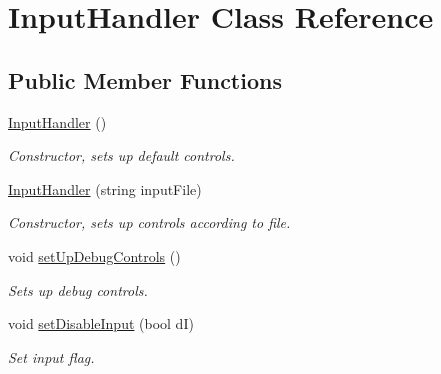 \hypertarget{class_input_handler}{}\section{Input\+Handler Class Reference}
\label{class_input_handler}
\subsection*{Public Member Functions}
\begin{DoxyCompactItemize}
\item 
\mbox{\label{class_input_handler_a698aa4af4f326a9881835fda251ca996}} 
\mbox{\hyperlink{class_input_handler_a698aa4af4f326a9881835fda251ca996}{Input\+Handler}} ()
\begin{DoxyCompactList}\small\item\em Constructor, sets up default controls. \end{DoxyCompactList}\item 
\mbox{\label{class_input_handler_a5f4d9f7ba9a8a9c02f5fdef3e8fe79c8}} 
\mbox{\hyperlink{class_input_handler_a5f4d9f7ba9a8a9c02f5fdef3e8fe79c8}{Input\+Handler}} (string input\+File)
\begin{DoxyCompactList}\small\item\em Constructor, sets up controls according to file. \end{DoxyCompactList}\item 
\mbox{\label{class_input_handler_ab3359d443715abc1968a354a91796fde}} 
void \mbox{\hyperlink{class_input_handler_ab3359d443715abc1968a354a91796fde}{set\+Up\+Debug\+Controls}} ()
\begin{DoxyCompactList}\small\item\em Sets up debug controls. \end{DoxyCompactList}\item 
\mbox{\label{class_input_handler_a163702711e7b2fac8ee03a50499cde36}} 
void \mbox{\hyperlink{class_input_handler_a163702711e7b2fac8ee03a50499cde36}{set\+Disable\+Input}} (bool dI)
\begin{DoxyCompactList}\small\item\em Set input flag. \end{DoxyCompactList}\item 

\end{DoxyCompactItemize}
